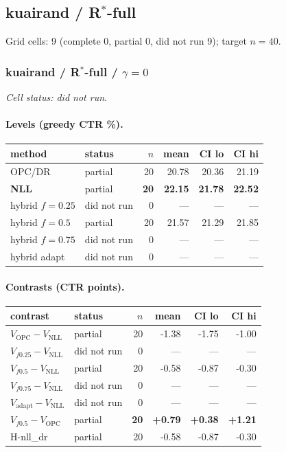 \documentclass[10pt,a4paper]{article}
\begin{document}
\subsection{kuairand / R$^*$-full}
Grid cells: 9 (complete 0, partial 0, did not run 9); target $n=40$.
\subsubsection{kuairand / R$^*$-full / $\gamma=0$}
\emph{Cell status: did not run}.
\paragraph{Levels (greedy CTR \%).}
{\centering\small\begin{tabular}{llrrrr}
\toprule method & status & $n$ & mean & CI lo & CI hi \\
\midrule
OPC/DR & partial & 20 & 20.78 & 20.36 & 21.19 \\
\textbf{NLL} & partial & \textbf{20} & \textbf{22.15} & \textbf{21.78} & \textbf{22.52} \\
hybrid $f{=}0.25$ & did not run & 0 & --- & --- & --- \\
hybrid $f{=}0.5$ & partial & 20 & 21.57 & 21.29 & 21.85 \\
hybrid $f{=}0.75$ & did not run & 0 & --- & --- & --- \\
hybrid adapt & did not run & 0 & --- & --- & --- \\
\bottomrule\end{tabular}\par}
\paragraph{Contrasts (CTR points).}
{\centering\small\begin{tabular}{llrrrr}
\toprule contrast & status & $n$ & mean & CI lo & CI hi \\
\midrule
$V_{\mathrm{OPC}}-V_{\mathrm{NLL}}$ & partial & 20 & -1.38 & -1.75 & -1.00 \\
$V_{f0.25}-V_{\mathrm{NLL}}$ & did not run & 0 & --- & --- & --- \\
$V_{f0.5}-V_{\mathrm{NLL}}$ & partial & 20 & -0.58 & -0.87 & -0.30 \\
$V_{f0.75}-V_{\mathrm{NLL}}$ & did not run & 0 & --- & --- & --- \\
$V_{\mathrm{adapt}}-V_{\mathrm{NLL}}$ & did not run & 0 & --- & --- & --- \\
\textbf{$V_{f0.5}-V_{\mathrm{OPC}}$} & partial & \textbf{20} & \textbf{+0.79} & \textbf{+0.38} & \textbf{+1.21} \\
H-nll\_dr & partial & 20 & -0.58 & -0.87 & -0.30 \\
\bottomrule\end{tabular}\par}
\bigskip
\end{document}
